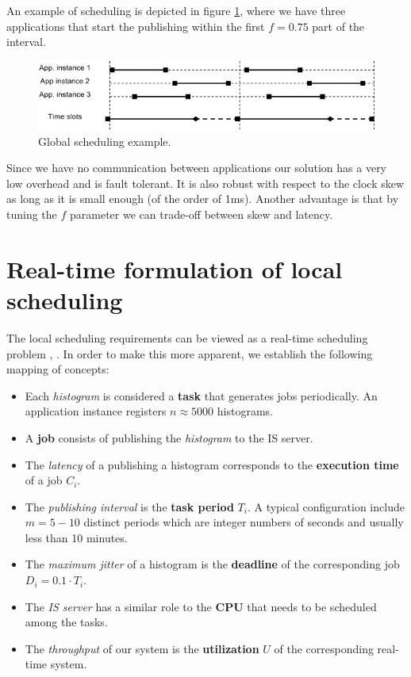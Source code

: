 An example of scheduling is depicted in figure \ref{fig:local_sched}, where we have three applications that start the publishing within the first $f=0.75$ part of the interval.

\begin{figure}[ht!]
\centering
\includegraphics[scale=0.6]{Images/local_sched.png}
\caption{Global scheduling example.}
\label{fig:local_sched}
\end{figure}

Since we have no communication between applications our solution has a very low overhead and is fault tolerant. It is also robust with respect to the clock skew as long as it is small enough (of the order of 1ms). Another advantage is that by tuning the $f$ parameter we can trade-off between skew and latency. 

\section{Real-time formulation of local scheduling}

The local scheduling requirements can be viewed as a real-time scheduling problem \citep{liu1973scheduling}, \citep{sha2004real}. In order to make this more apparent, we establish the following mapping of concepts:
\begin{itemize}
\item Each \emph{histogram} is considered a {\bf task} that generates jobs periodically. An application instance registers $n \approx 5000$ histograms.
\item A {\bf job} consists of publishing the \emph{histogram} to the IS server.
\item The \emph{latency} of a publishing a histogram corresponds to the {\bf execution time} of a job $C_i$. 
\item The \emph{publishing interval} is the {\bf task period} $T_i$. A typical configuration include $m=5-10$ distinct periods which are integer numbers of seconds and usually less than 10 minutes.
\item The \emph{maximum jitter} of a histogram is the {\bf deadline} of the corresponding job $D_i=0.1\cdot T_i$.
\item The \emph{IS server} has a similar role to the {\bf CPU} that needs to be scheduled among the tasks.
\item The \emph{throughput} of our system is the {\bf utilization} $U$ of the corresponding real-time system.
\end{itemize}

